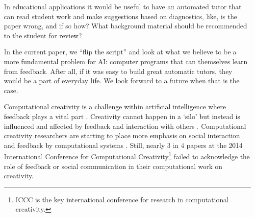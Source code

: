 %
%
%
%

%
%

In educational applications it would be useful to have an automated tutor that can read student work and make suggestions based on diagnostics, like, is the paper wrong, and if so how?  What background material should be recommended to the student for review?

In the current paper, we ``flip the script'' and look at what we believe to be a more fundamental problem for AI: computer programs that can themselves learn from feedback.  After all, if it was easy to build great automatic tutors, they would be a part of everyday life.  We look forward to a future when that is the case.

Computational creativity is a challenge within artificial intelligence where feedback plays a vital part \cite<for example>{perezyperez10MM,pease10}. Creativity cannot happen in a `silo' but instead is influenced and affected by feedback and interaction with others \cite{csik88,saunders2012towards}. Computational creativity researchers are starting to place more emphasis on social interaction and feedback by computational systems \cite{saunders2012towards,gervas2014reading,corneli15iccc}. Still, nearly 3 in 4 papers at the 2014 International Conference for Computational Creativity\footnote{ICCC is  the key international conference for research in computational creativity.} failed to acknowledge the role of feedback or social communication in their computational work on creativity. 

